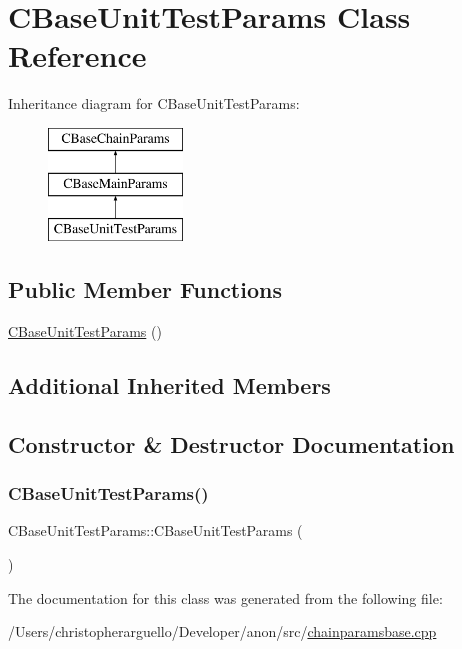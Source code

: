 \hypertarget{class_c_base_unit_test_params}{}\section{C\+Base\+Unit\+Test\+Params Class Reference}
\label{class_c_base_unit_test_params}
Inheritance diagram for C\+Base\+Unit\+Test\+Params\+:\begin{figure}[H]
\begin{center}
\leavevmode
\includegraphics[height=3.000000cm]{class_c_base_unit_test_params}
\end{center}
\end{figure}
\subsection*{Public Member Functions}
\begin{DoxyCompactItemize}
\item 
\mbox{\hyperlink{class_c_base_unit_test_params_a5adade9edcf1ebefc89ff198d0d52ff5}{C\+Base\+Unit\+Test\+Params}} ()
\end{DoxyCompactItemize}
\subsection*{Additional Inherited Members}


\subsection{Constructor \& Destructor Documentation}
\mbox{\label{class_c_base_unit_test_params_a5adade9edcf1ebefc89ff198d0d52ff5}} 
\subsubsection{\texorpdfstring{C\+Base\+Unit\+Test\+Params()}{CBaseUnitTestParams()}}
{\footnotesize\ttfamily C\+Base\+Unit\+Test\+Params\+::\+C\+Base\+Unit\+Test\+Params (\begin{DoxyParamCaption}{ }\end{DoxyParamCaption})\hspace{0.3cm}{\ttfamily [inline]}}



The documentation for this class was generated from the following file\+:\begin{DoxyCompactItemize}
\item 
/\+Users/christopherarguello/\+Developer/anon/src/\mbox{\hyperlink{chainparamsbase_8cpp}{chainparamsbase.\+cpp}}\end{DoxyCompactItemize}
